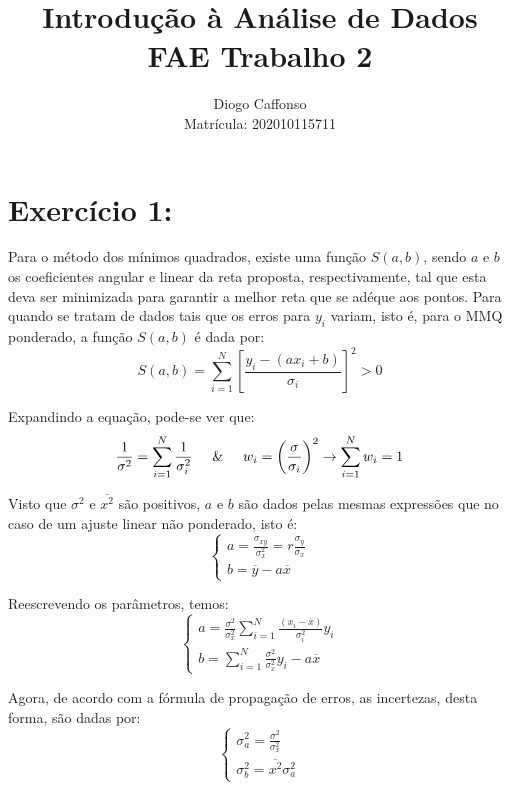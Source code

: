 \documentclass[14pt]{extarticle}
\title{Introdução à Análise de Dados FAE Trabalho 2}
\author{}
\date{Diogo Caffonso\\Matrícula: 202010115711}
\begin{document}
\maketitle
\thispagestyle{empty}

\newpage

\setcounter{page}{1}

\section*{\hspace{-1cm}Exercício 1:}

\hspace{0.5cm}
Para o método dos mínimos quadrados, existe uma função $S(a,b)$, sendo $a$ e $b$ os coeficientes angular e linear da reta proposta, respectivamente, tal que esta deva ser minimizada para garantir a melhor reta que se adéque aos pontos. Para quando se tratam de dados tais que os erros para $y_{i}$ variam, isto é, para o MMQ ponderado, a função $S(a,b)$ é dada por:\large$$S(a,b)=\sum_{i=1}^{N}\left[\frac{y_{i}-(ax_{i}+b)}{\sigma_{i}}\right]^{2}>0$$\normalsize

Expandindo a equação, pode-se ver que:\large$$\frac{1}{\sigma^{2}}=\sum_{i=1}^{N}\frac{1}{\sigma_{i}^{2}}\hspace{0.5cm}\&\hspace{0.5cm}w_{i}=\left(\frac{\sigma}{\sigma_{i}}\right)^{2}\to\sum_{i=1}^{N}w_{i}=1$$\normalsize

Visto que $\sigma^{2}$ e $\overline{x^{2}}$ são positivos, $a$ e $b$ são dados pelas mesmas expressões que no caso de um ajuste linear não ponderado, isto é:\large$$
\begin{cases}
    a = \frac{\sigma_{xy}}{\sigma_{x}^{2}}=r\frac{\sigma_{y}}{\sigma_{x}} \\
    b = \overline{y} - a\overline{x}
\end{cases}
$$\normalsize

Reescrevendo os parâmetros, temos:\large$$
\begin{cases}
    a = \frac{\sigma^{2}}{\sigma_{x}^{2}}\sum_{i=1}^{N}\frac{(x_{i}-\overline{x})}{\sigma_{i}^{2}}y_{i} \\
    b = \sum_{i=1}^{N}\frac{\sigma^{2}}{\sigma_{x}^{2}}y_{i}-a\overline{x}
\end{cases}$$\normalsize

Agora, de acordo com a fórmula de propagação de erros, as incertezas, desta forma, são dadas por:\large$$
\begin{cases}
    \sigma_{a}^{2}=\frac{\sigma^{2}}{\sigma_{x}^{2}} \\[0.5cm]
    \sigma_{b}^{2}=\overline{x^{2}}\sigma_{a}^{2}
\end{cases}$$\normalsize
\end{document}
